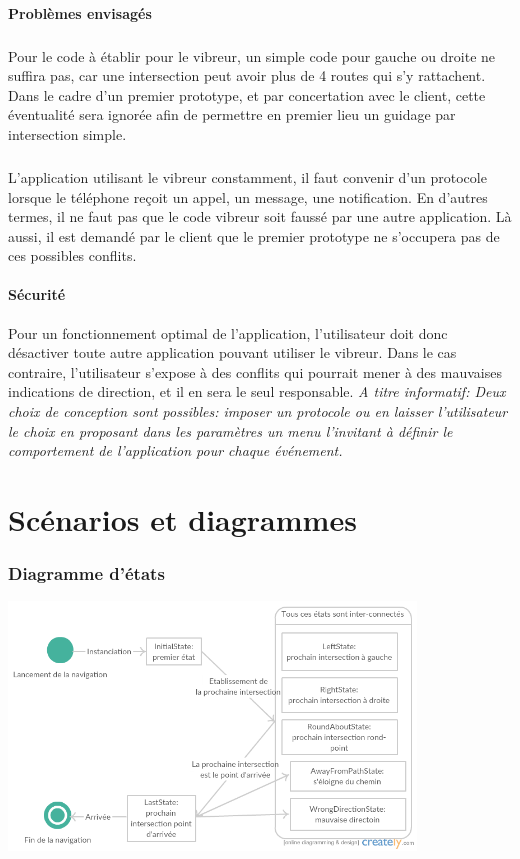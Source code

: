 {\paragraph{Problèmes envisagés}\subparagraph{} Pour le code à établir pour le vibreur, un simple code pour gauche ou droite ne suffira pas, car une intersection peut avoir plus de 4 routes qui s'y rattachent. Dans le cadre d'un premier prototype, et par concertation avec le client, cette éventualité sera ignorée afin de permettre en premier lieu un guidage par intersection simple.
\subparagraph{} L'application utilisant le vibreur constamment, il faut convenir d'un protocole lorsque le téléphone reçoit un appel, un message, une notification. En d'autres termes, il ne faut pas que le code vibreur soit faussé par une autre application. Là aussi, il est demandé par le client que le premier prototype ne s'occupera pas de ces possibles conflits. 

\paragraph{Sécurité}
Pour un fonctionnement optimal de l'application, l'utilisateur doit donc désactiver toute autre application pouvant utiliser le vibreur. Dans le cas contraire, l'utilisateur s'expose à des conflits qui pourrait mener à des mauvaises indications de direction, et il en sera le seul responsable. \emph{A titre informatif: Deux choix de conception sont possibles: imposer un protocole ou en laisser l'utilisateur le choix en proposant dans les paramètres un menu l'invitant à définir le comportement de l'application pour chaque événement.}

\newpage

\section{Scénarios et diagrammes}

\subsubsection{Diagramme d'états}
\begin{center}
\includegraphics[height=250px]{Assets/State_navigation.png}
\end{center}

}

